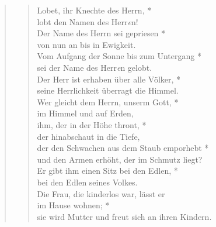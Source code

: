 \begin{quote}

\begin{verse}
Lobet, ihr Knechte des Herrn, *\\
lobt den Namen des Herr\textit{e}n!\\ 
\vin Der Name des Herrn sei gepriesen *\\ 
\vin von nun an bis in Ewigkeit.\\
Vom Aufgang der Sonne bis zum Untergang *\\
sei der Name des Herr{\textit{e}}n gelobt.\\ 
\vin Der Herr ist erhaben über alle Völker, *\\ 
\vin seine Herrlichkeit überragt die Himmel.\\ 
Wer gleicht dem Herrn, unserm Gott, *\\
im Himmel und auf Erden,\\ 
\vin ihm, der in der Höhe thront, *\\ 
\vin der hinabschaut in die Tiefe, \\
der den Schwachen aus dem Staub emporhebt *\\
und den Armen erhöht, der im Schmutz liegt?\\ 
\vin Er gibt ihm einen Sitz bei den Edlen, *\\ 
\vin bei den Edlen seines Volkes.\\ 
Die Frau, die kinderlos war, lässt er\\
im Hause wohnen; *\\
sie wird Mutter und freut sich an ihren Kindern.\\ 

\end{verse}
\end{quote}

\vspace{0.3cm}





